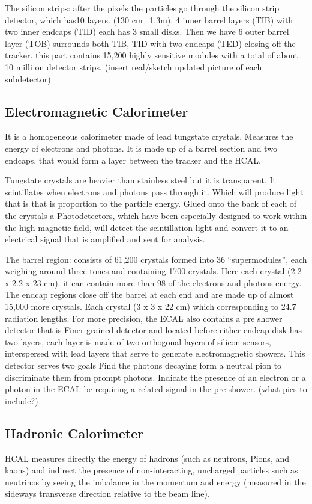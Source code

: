 The silicon strips: after the pixels the particles go through the silicon strip detector, which has10 layers. (130 cm~ 1.3m). 4 inner barrel layers (TIB) with two inner endcaps (TID) each has 3 small disks. Then we have 6 outer barrel layer (TOB) surrounds both TIB, TID with two endcaps (TED) closing off the tracker. this part contains 15,200 highly sensitive modules with a total of about 10 milli on detector strips. (insert real/sketch updated picture of each subdetector) 

\subsection{Electromagnetic Calorimeter}
It is a homogeneous calorimeter made of lead tungstate crystals. Measures the energy of electrons and photons. It is made up of a barrel section and two endcaps, that would form a layer between the tracker and the HCAL.

Tungstate crystals are heavier than stainless steel but it is transparent. It scintillates when electrons and photons pass through it. Which will produce light that is that is proportion to the particle energy. Glued onto the back of each of the crystals a Photodetectors, which have been especially designed to work within the high magnetic field, will detect the scintillation light and convert it to an electrical signal that is amplified and sent for analysis.

The barrel region: consists of 61,200 crystals formed into 36 “supermodules”, each weighing around three tones and containing 1700 crystals. Here each crystal (2.2 x 2.2 x 23 cm). it can contain more than 98 of the electrons and photons energy. The endcap regions close off the barrel at each end and are made up of almost 15,000 more crystals. Each crystal (3 x 3 x 22 cm) which corresponding to 24.7 radiation lengths. For more precision, the ECAL also contains a pre shower detector that is Finer grained detector and located before either endcap disk has two layers, each layer is made of two orthogonal layers of silicon sensors, interspersed with lead layers that serve to generate electromagnetic showers. This detector serves two goals Find the photons decaying form a neutral pion to discriminate them from prompt photons.  Indicate the presence of an electron or a photon in the ECAL be requiring a related signal in the pre shower. (what pics to include?) 

\subsection{Hadronic Calorimeter}
HCAL measures directly the energy of hadrons (such as neutrons, Pions, and kaons) and indirect the presence of non-interacting, uncharged particles such as neutrinos by seeing the imbalance in the momentum and energy (measured in the sideways transverse direction relative to the beam line).

